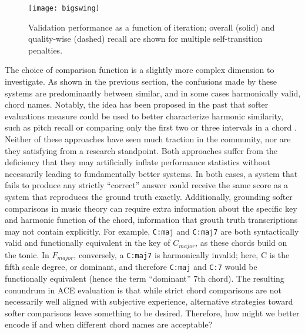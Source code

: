 \begin{figure}[!t]
\centering
\texttt{[image: bigswing]}
\caption{Validation performance as a function of iteration; overall (solid) and quality-wise (dashed) recall are shown for multiple self-transition penalties.}
\label{fig:bigswing}
\end{figure}

The choice of comparison function is a slightly more complex dimension to investigate.
As shown in the previous section, the confusions made by these systems are predominantly between similar, and in some cases harmonically valid, chord names.
Notably, the idea has been proposed in the past that softer evaluations measure could be used to better characterize harmonic similarity, such as pitch recall or comparing only the first two or three intervals in a chord \cite{Harte2010PhD}.
Neither of these approaches have seen much traction in the community, nor are they satisfying from a research standpoint.
Both approaches suffer from the deficiency that they may artificially inflate performance statistics without necessarily leading to fundamentally better systems.
In both cases, a system that fails to produce any strictly ``correct'' answer could receive the same score as a system that reproduces the ground truth exactly.
Additionally, grounding softer comparisons in music theory can require extra information about the specific key and harmonic function of the chord, information that grouth truth transcriptions may not contain explicitly.
For example, \texttt{C:maj} and \texttt{C:maj7} are both syntactically valid and functionally equivalent in the key of $C_{major}$, as these chords build on the tonic.
In $F_{major}$, conversely, a \texttt{C:maj7} is harmonically invalid; here, C is the fifth scale degree, or dominant, and therefore \texttt{C:maj} and \texttt{C:7} would be functionally equivalent (hence the term ``dominant'' 7th chord).
The resulting conundrum in ACE evaluation is that while strict chord comparisons are not necessarily well aligned with subjective experience, alternative strategies toward softer comparisons leave something to be desired.
Therefore, how might we better encode if and when different chord names are acceptable?

